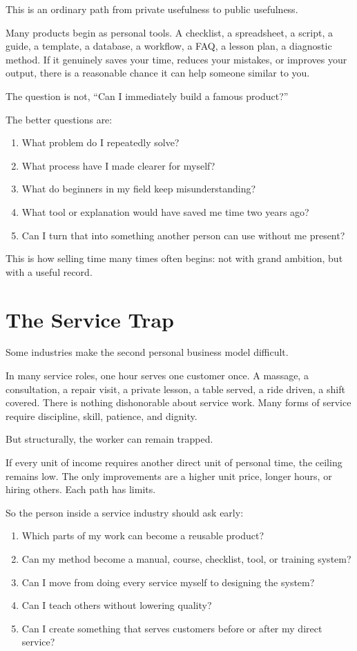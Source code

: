 This is an ordinary path from private usefulness to public usefulness.

Many products begin as personal tools. A checklist, a spreadsheet, a script, a guide, a template, a database, a workflow, a FAQ, a lesson plan, a diagnostic method. If it genuinely saves your time, reduces your mistakes, or improves your output, there is a reasonable chance it can help someone similar to you.

The question is not, ``Can I immediately build a famous product?''

The better questions are:

\begin{enumerate}
\item What problem do I repeatedly solve?
\item What process have I made clearer for myself?
\item What do beginners in my field keep misunderstanding?
\item What tool or explanation would have saved me time two years ago?
\item Can I turn that into something another person can use without me present?
\end{enumerate}

This is how selling time many times often begins: not with grand ambition, but with a useful record.

\section*{The Service Trap}

Some industries make the second personal business model difficult.

In many service roles, one hour serves one customer once. A massage, a consultation, a repair visit, a private lesson, a table served, a ride driven, a shift covered. There is nothing dishonorable about service work. Many forms of service require discipline, skill, patience, and dignity.

But structurally, the worker can remain trapped.

If every unit of income requires another direct unit of personal time, the ceiling remains low. The only improvements are a higher unit price, longer hours, or hiring others. Each path has limits.

So the person inside a service industry should ask early:

\begin{enumerate}
\item Which parts of my work can become a reusable product?
\item Can my method become a manual, course, checklist, tool, or training system?
\item Can I move from doing every service myself to designing the system?
\item Can I teach others without lowering quality?
\item Can I create something that serves customers before or after my direct service?
\end{enumerate}

